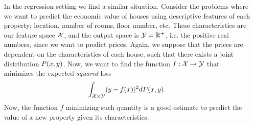 %
In the regression setting we find a similar situation. Consider the problems where we want to predict the economic value of houses using descriptive features of each property: location, number of rooms, floor number, etc. These characteristics are our feature space $\mathcal{X}$, and the output space is $\mathcal{Y} = \mathbb{R}^+$, i.e. the positive real numbers, since we want to predict prices. Again, we suppose that the prices are dependent on the characteristics of each house, such that there exists a joint distribution $P(x, y)$.
Now, we want to find the function $f: \mathcal{X} \to \mathcal{Y}$ that minimizes the expected \emph{squared} loss
$$ \int_{\mathcal{X} \times \mathcal{Y}} (y - f(x))^2 dP(x, y) .$$
Now, the function $f$ minimizing such quantity is a good estimate to predict the value of a new property given its characteristics.

